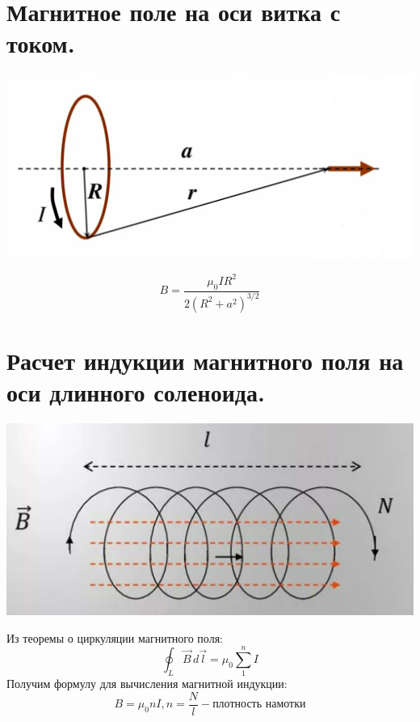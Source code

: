 \documentclass[12pt]{report}
\begin{document}
\section{Магнитное поле на оси витка с током.}
\begin{center}
    \includegraphics[scale=0.5]{graphics/t23.png}
\end{center}
\[B=\frac{\mu_0IR^2}{2(R^2+a^2)^{3/2}}\]
\section{Расчет индукции магнитного поля на оси длинного соленоида.}
\begin{center}
    \includegraphics[scale=0.7]{graphics/t24.png}
\end{center}
Из теоремы о циркуляции магнитного поля:
\[\oint_{L} \overrightarrow{B}\,d\overrightarrow{l} = \mu_0 \sum_{1}^{n} I\]
Получим формулу для вычисления магнитной индукции:
\[B=\mu_0nI, n=\frac{N}{l}-\text{плотность намотки}\]
\end{document}

